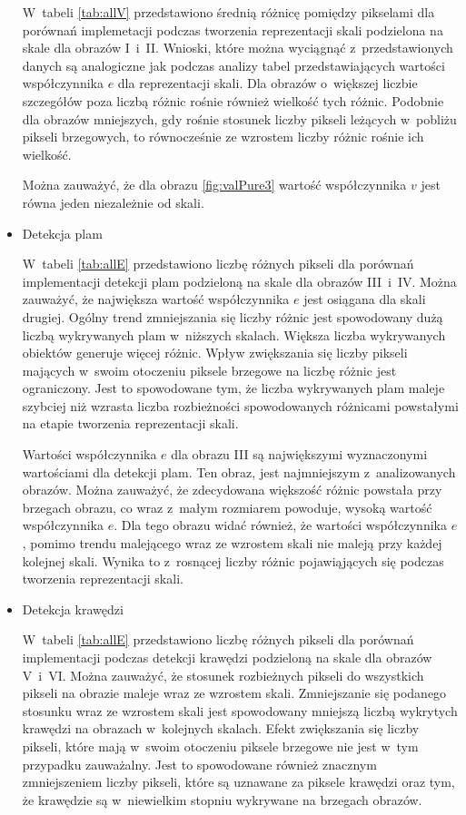 \begin{itemize}
W~tabeli \ref{tab:allV} przedstawiono średnią różnicę pomiędzy pikselami dla porównań implemetacji podczas tworzenia reprezentacji skali podzielona na skale dla obrazów I~i~II. Wnioski, które można wyciągnąć z~przedstawionych danych są analogiczne jak podczas analizy tabel przedstawiających wartości współczynnika $ e $ dla reprezentacji skali. Dla obrazów o~większej liczbie szczegółów poza liczbą różnic rośnie również wielkość tych różnic. Podobnie dla obrazów mniejszych, gdy rośnie stosunek liczby pikseli leżących w~pobliżu pikseli brzegowych, to równocześnie ze wzrostem liczby różnic rośnie ich wielkość.

Można zauważyć, że dla obrazu \ref{fig:valPure3} wartość współczynnika $ v $ jest równa jeden niezależnie od skali.

\item{Detekcja plam}
\label{subsubsec:plamyTabele}

W~tabeli \ref{tab:allE} przedstawiono liczbę różnych pikseli dla porównań implementacji detekcji plam podzieloną na skale dla obrazów III~i~IV. Można zauważyć, że największa wartość współczynnika $ e $ jest osiągana dla skali drugiej. Ogólny trend zmniejszania się liczby różnic jest spowodowany dużą liczbą wykrywanych plam w~niższych skalach. Większa liczba wykrywanych obiektów generuje więcej różnic. Wpływ zwiększania się liczby pikseli mających w~swoim otoczeniu piksele brzegowe na liczbę różnic jest ograniczony. Jest to spowodowane tym, że liczba wykrywanych plam maleje szybciej niż wzrasta liczba rozbieżności spowodowanych różnicami powstałymi na etapie tworzenia reprezentacji skali.

Wartości współczynnika $ e $ dla obrazu III są największymi wyznaczonymi wartościami dla detekcji plam. Ten obraz, jest najmniejszym z~analizowanych obrazów. Można zauważyć, że zdecydowana większość różnic powstała przy brzegach obrazu, co wraz z~małym rozmiarem powoduje, wysoką wartość współczynnika $ e $. Dla tego obrazu widać również, że wartości współczynnika $ e $, pomimo trendu malejącego wraz ze wzrostem skali nie maleją przy każdej kolejnej skali. Wynika to z~rosnącej liczby różnic pojawiąjących się podczas tworzenia reprezentacji skali.


\item{Detekcja krawędzi}
\label{subsubsec:krawedzieTabele}

W~tabeli \ref{tab:allE} przedstawiono liczbę różnych pikseli dla porównań implementacji podczas detekcji krawędzi podzieloną na skale dla obrazów V~i~VI. Można zauważyć, że stosunek rozbieżnych pikseli do wszystkich pikseli na obrazie maleje wraz ze wzrostem skali. Zmniejszanie się podanego stosunku wraz ze wzrostem skali jest spowodowany mniejszą liczbą wykrytych krawędzi na obrazach w~kolejnych skalach. Efekt zwiększania się liczby pikseli, które mają w~swoim otoczeniu piksele brzegowe nie jest w~tym przypadku zauważalny. Jest to spowodowane również znacznym zmniejszeniem liczby pikseli, które są uznawane za piksele krawędzi oraz tym, że krawędzie są w~niewielkim stopniu wykrywane na brzegach obrazów.


\end{itemize}

